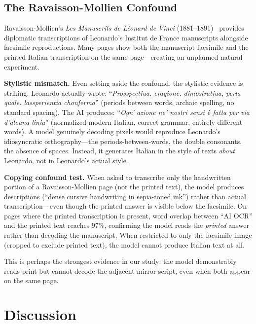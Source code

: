 \documentclass[10pt,twocolumn]{article}
\begin{document}
\subsection{The Ravaisson-Mollien Confound}

Ravaisson-Mollien's \emph{Les Manuscrits de L\'eonard de Vinci} (1881--1891)~\cite{ravaisson1881} provides diplomatic transcriptions of Leonardo's Institut de France manuscripts alongside facsimile reproductions. Many pages show both the manuscript facsimile and the printed Italian transcription on the same page---creating an unplanned natural experiment.

\textbf{Stylistic mismatch.} Even setting aside the confound, the stylistic evidence is striking. Leonardo actually wrote: ``\emph{Prosspectiua. eragione. dimostratiua, perla quale. lassperientia chonferma}'' (periods between words, archaic spelling, no standard spacing). The AI produces: ``\emph{Ogn' azione ne' nostri sensi \`e fatta per via d'alcuna linia}'' (normalized modern Italian, correct grammar, entirely different words). A model genuinely decoding pixels would reproduce Leonardo's idiosyncratic orthography---the periods-between-words, the double consonants, the absence of spaces. Instead, it generates Italian in the style of texts \emph{about} Leonardo, not in Leonardo's actual style.

\textbf{Copying confound test.} When asked to transcribe only the handwritten portion of a Ravaisson-Mollien page (not the printed text), the model produces descriptions (``dense cursive handwriting in sepia-toned ink'') rather than actual transcription---even though the printed answer is visible below the facsimile. On pages where the printed transcription is present, word overlap between ``AI OCR'' and the printed text reaches 97\%, confirming the model reads the \emph{printed} answer rather than decoding the manuscript. When restricted to only the facsimile image (cropped to exclude printed text), the model cannot produce Italian text at all.

This is perhaps the strongest evidence in our study: the model demonstrably reads print but cannot decode the adjacent mirror-script, even when both appear on the same page.

\section{Discussion}
\end{document}
